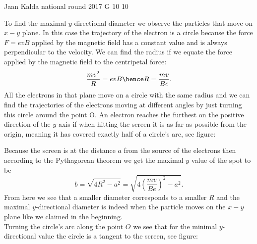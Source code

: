 \documentclass[11pt]{article}
\begin{document}
{Jaan Kalda} %
{national round} %
{2017} %
{G 10} %
{10} %
{

\ifEngSolution
To find the maximal $y$-directional diameter we observe the particles that move on $x-y$ plane. In this case the trajectory of the electron is a circle because the force $F=evB$ applied by the magnetic field has a constant value and is always perpendicular to the velocity. We can find the radius if we equate the force applied by the magnetic field to the centripetal force:
$$\frac{mv^2}{R}=evB \hence R = \frac{mv}{Be}.$$
All the electrons in that plane move on a circle with the same radius and we can find the trajectories of the electrons moving at different angles by just turning this circle around the point O. An electron reaches the furthest on the positive direction of the $y$-axis if when hitting the screen it is as far as possible from the origin, meaning it has covered exactly half of a circle’s arc, see figure:
\begin{center}
\end{center}
Because the screen is at the distance $a$ from the source of the electrons then according to the Pythagorean theorem we get the maximal $y$ value of the spot to be 
$$b=\sqrt{4R^2-a^2} = \sqrt{4\left(\frac{mv}{Be}\right)^2-a^2}.$$
From here we see that a smaller diameter corresponds to a smaller $R$ and the maximal $y$-directional diameter is indeed when the particle moves on the $x-y$ plane like we claimed in the beginning.\\
Turning the circle’s arc along the point $O$ we see that for the minimal $y$-directional value the circle is a tangent to the screen, see figure:
}
\end{document}
